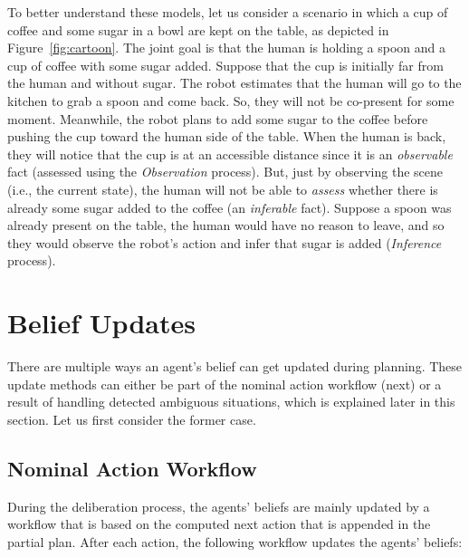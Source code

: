 \documentclass[letterpaper]{article} %
\begin{document}
To better understand these models, let
us consider a scenario in which a cup of coffee and some sugar in a bowl are kept on the table, as depicted in Figure~\ref{fig:cartoon}. The joint goal is that the human is holding a spoon and a cup of coffee with some sugar added. 
Suppose that the cup is initially far from the human and without sugar. 
The robot estimates that the human will go to the kitchen to grab a spoon and come back. So, they will not be co-present for some moment. 
Meanwhile, the robot plans to add some sugar to the coffee before pushing the cup toward the human side of the table.
When the human is back, they will notice that the cup is at an accessible distance since it is an \textit{observable} fact (assessed using the \textit{Observation} process). 
But, just by observing the scene (i.e., the current state), the human will not be able to \textit{assess} whether there is already some sugar added to the coffee (an \textit{inferable} fact). 
Suppose a spoon was already present on the table, the human would have no reason to leave, and so they would observe the robot's action and infer that sugar is added (\textit{Inference} process).


\section{Belief Updates} \label{sec:beliefs-updates}
There are multiple ways an agent's belief can get updated during planning. These update methods can either be part of the nominal action workflow (next) or a result of handling detected ambiguous situations, which is explained later in this section. Let us first consider the former case.

\subsection{Nominal Action Workflow}
During the deliberation process, the agents' beliefs are mainly updated by a workflow that is based on the computed next action that is appended in the partial plan.
After each action, the following workflow updates the agents' beliefs:
\end{document}
